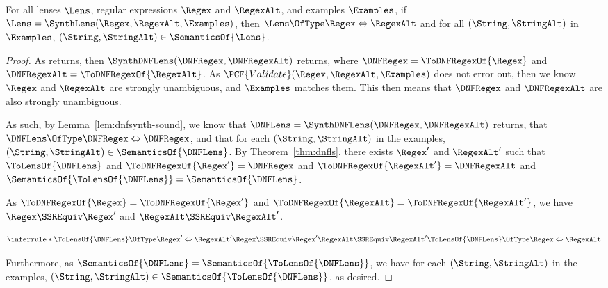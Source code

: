 \documentclass[sigplan,acmsmall]{acmart}
\begin{document}
\begin{theorem}
  For all lenses $\Lens$, regular expressions $\Regex$ and $\RegexAlt$, and
  examples $\Examples$, 
  if \\$\Lens = \SynthLens(\Regex,\RegexAlt,\Examples)$, then
  $\Lens \OfType \Regex \Leftrightarrow \RegexAlt$ and for all
  $(\String,\StringAlt)$ in $\Examples$, $(\String,\StringAlt) \in
  \SemanticsOf{\Lens}$.
\end{theorem}
\begin{proof}
  As \SynthLens{} returns, then $\SynthDNFLens(\DNFRegex,\DNFRegexAlt)$ returns,
  where $\DNFRegex = \ToDNFRegexOf{\Regex}$ and $\DNFRegexAlt =
  \ToDNFRegexOf{\RegexAlt}$.  As $\PCF{Validate}(\Regex,\RegexAlt,\Examples)$
  does not error out, then we know $\Regex$ and $\RegexAlt$ are strongly
  unambiguous, and $\Examples$ matches them.  This then means that $\DNFRegex$
  and $\DNFRegexAlt$ are also strongly unambiguous.

  As such, by Lemma~\ref{lem:dnfsynth-sound}, we know that $\DNFLens =
  \SynthDNFLens(\DNFRegex,\DNFRegexAlt)$ returns, that $\DNFLens \OfType
  \DNFRegex \Leftrightarrow \DNFRegex$, and that for each $(\String,\StringAlt)$
  in the examples, $(\String,\StringAlt) \in \SemanticsOf{\DNFLens}$.  By Theorem~\ref{thm:dnfls}, there
  exists $\Regex'$ and $\RegexAlt'$ such that $\ToLensOf{\DNFLens}$ and
  $\ToDNFRegexOf{\Regex'} = \DNFRegex$ and $\ToDNFRegexOf{\RegexAlt'} =
  \DNFRegexAlt$ and $\SemanticsOf{\ToLensOf{\DNFLens}} =
  \SemanticsOf{\DNFLens}$.

  As $\ToDNFRegexOf{\Regex} = \ToDNFRegexOf{\Regex'}$ and
  $\ToDNFRegexOf{\RegexAlt} = \ToDNFRegexOf{\RegexAlt'}$, we have
  $\Regex \SSREquiv \Regex'$ and $\RegexAlt \SSREquiv \RegexAlt'$.

  \[
    \inferrule*
    {
      \ToLensOf{\DNFLens} \OfType \Regex' \Leftrightarrow \RegexAlt'\\
      \Regex \SSREquiv \Regex'\\
      \RegexAlt \SSREquiv \RegexAlt'\\
    }
    {
      \ToLensOf{\DNFLens} \OfType \Regex \Leftrightarrow \RegexAlt
    }
  \]

  Furthermore, as $\SemanticsOf{\DNFLens} = \SemanticsOf{\ToLensOf{\DNFLens}}$,
  we have for each $(\String,\StringAlt)$ in the examples, $(\String,\StringAlt)
  \in \SemanticsOf{\ToLensOf{\DNFLens}}$, as desired.
\end{proof}
\end{document}

